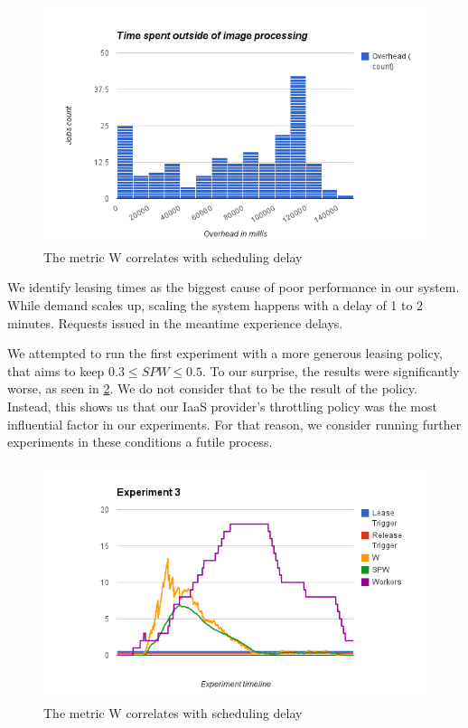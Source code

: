 \documentclass{stylesheet}
\begin{document}
\begin{figure}[b!]
	\centering
	\includegraphics[width=\linewidth]{overhead-const.png}
	\caption{The metric W correlates with scheduling delay}
	\label{fig:overhead-const}
\end{figure}

We identify leasing times as the biggest cause of poor performance in our system. While demand scales up, scaling the system happens with a delay of 1 to 2 minutes. Requests issued in the meantime experience delays.

We attempted to run the first experiment with a more generous leasing policy, that aims to keep $0.3 \leq SPW \leq 0.5$. To our surprise, the results were significantly worse, as seen in \cref{fig:exp3-timeline}. We do not consider that to be the result of the policy. Instead, this shows us that our IaaS provider's throttling policy was the most influential factor in our experiments. For that reason, we consider running further experiments in these conditions a futile process.

\begin{figure}[b!]
	\centering
	\includegraphics[width=\linewidth]{exp3-timeline.png}
	\caption{The metric W correlates with scheduling delay}
	\label{fig:exp3-timeline}
\end{figure}
\end{document}

